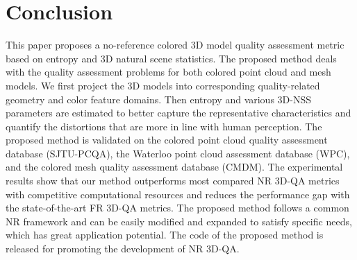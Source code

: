 \documentclass[lettersize,journal]{IEEEtran}
\begin{document}
\section{Conclusion}
This paper proposes a no-reference colored 3D model quality assessment metric based on entropy and 3D natural scene statistics. The proposed method deals with the quality assessment problems for both colored point cloud and mesh models. We first project the 3D models into corresponding quality-related geometry and color feature domains. Then entropy and various 3D-NSS parameters are estimated to better capture the representative characteristics and quantify the distortions that are more in line with human perception. The proposed method is validated on the colored point cloud quality assessment database (SJTU-PCQA), the Waterloo point cloud assessment database (WPC), and the colored mesh quality assessment database (CMDM). The experimental results show that our method outperforms most compared NR 3D-QA metrics with competitive computational resources and reduces the performance gap with the state-of-the-art FR 3D-QA metrics. The proposed method follows a common NR framework and can be easily modified and expanded to satisfy specific needs, which has great application potential. The code of the proposed method is released for promoting the development of NR 3D-QA.
\label{sec:conclusion}

















\end{document}
